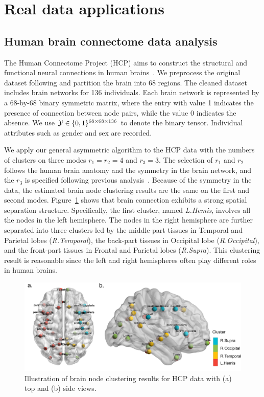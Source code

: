 \documentclass[journal]{IEEEtran}
\theoremstyle{definition}
\theoremstyle{definition}
\begin{document}
\section{Real data applications}\label{sec:real}
\subsection{Human brain connectome data analysis}

The Human Connectome Project (HCP) aims to construct the structural and functional neural connections in human brains~\citep{van2013wu}. We preprocess the original dataset following \cite{desikan2006automated} and partition the brain into 68 regions. The cleaned dataset includes brain networks for 136 individuals. Each brain network is represented by a 68-by-68 binary symmetric matrix, where the entry with value 1 indicates the presence of connection between node pairs, while the value 0 indicates the absence. We use $\mathcal{Y} \in \{0,1\}^{68 \times 68 \times 136}$ to denote the binary tensor. Individual attributes such as gender and sex are recorded.

We apply our general asymmetric algorithm to the HCP data with the numbers of clusters on three modes $r_1 = r_2 = 4$ and $r_3 = 3$. The selection of $r_1$ and $r_2$ follows the human brain anatomy and the symmetry in the brain network, and the $r_3$ is specified following previous analysis~\citep{hu2021generalized}. Because of the symmetry in the data, the estimated brain node clustering results are the same on the first and second modes. Figure~\ref{fig:cluster_brain} shows that brain connection exhibits a strong spatial separation structure. Specifically, the first cluster, named \emph{L.Hemis}, involves all the nodes in the left hemisphere. The nodes in the right hemisphere are further separated into three clusters led by the middle-part tissues in Temporal and Parietal lobes (\emph{R.Temporal}), the back-part tissues in Occipital lobe (\emph{R.Occipital}), and the front-part tissues in Frontal and Parietal lobes (\emph{R.Supra}). This clustering result is reasonable since the left and right hemispheres often play different roles in human brains. 

\begin{figure}[htb]
    \centering
    \includegraphics[width = .7\textwidth]{brain_node_cluster.pdf}
    \caption{Illustration of brain node clustering results for HCP data with (a) top and (b) side views. }
    \label{fig:cluster_brain}
\end{figure}
\end{document}
